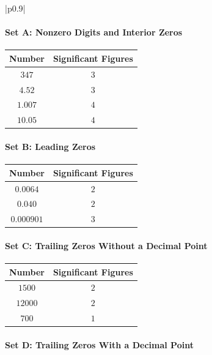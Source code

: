 \documentclass{article}
\begin{document}
\begin{tabular}{|p{0.9\linewidth}|}
\hline
\paragraph{Set A: Nonzero Digits and Interior Zeros}

\begin{center}
\begin{tabular}{c c}
\textbf{Number} & \textbf{Significant Figures} \\
\hline
$347$ & $3$ \\
$4.52$ & $3$ \\
$1.007$ & $4$ \\
$10.05$ & $4$
\end{tabular}
\end{center}

\paragraph{Set B: Leading Zeros}

\begin{center}
\begin{tabular}{c c}
\textbf{Number} & \textbf{Significant Figures} \\
\hline
$0.0064$ & $2$ \\
$0.040$ & $2$ \\
$0.000901$ & $3$
\end{tabular}
\end{center}

\paragraph{Set C: Trailing Zeros Without a Decimal Point}

\begin{center}
\begin{tabular}{c c}
\textbf{Number} & \textbf{Significant Figures} \\
\hline
$1500$ & $2$ \\
$12000$ & $2$ \\
$700$ & $1$
\end{tabular}
\end{center}

\paragraph{Set D: Trailing Zeros With a Decimal Point}


\end{tabular}
\end{document}
